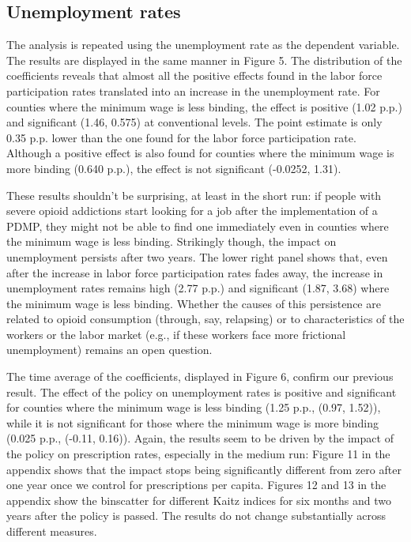 \documentclass[12pt,a4paper]{article}
\begin{document}
\begin{comment}
After six months:
1.79 (0.955, 2.63)
0.333 (-0.665, 1.33)

After two years:
-0.118 (-1.66, 1.42)
-0.599 (-3.10, 1.90)

Time averages:
1.06  (0.584, 1.55)
0.182 (-0.335, 0.698)
\end{comment}

\subsection*{Unemployment rates}

The analysis is repeated using the unemployment rate as the dependent variable.
The results are displayed in the same manner in Figure 5.
The distribution of the coefficients reveals that almost all the positive effects found in the labor force participation rates translated into an increase in the unemployment rate.
For counties where the minimum wage is less binding, the effect is positive (1.02 p.p.) and significant (1.46, 0.575) at conventional levels. 
The point estimate is only 0.35 p.p. lower than the one found for the labor force participation rate.
Although a positive effect is also found for counties where the minimum wage is more binding (0.640 p.p.), the effect is not significant (-0.0252, 1.31).

These results shouldn't be surprising, at least in the short run: if people with severe opioid addictions start looking for a job after the implementation of a PDMP, they might not be able to find one immediately even in counties where the minimum wage is less binding.
Strikingly though, the impact on unemployment persists after two years.
The lower right panel shows that, even after the increase in labor force participation rates fades away, the increase in unemployment rates remains high (2.77 p.p.) and significant (1.87, 3.68) where the minimum wage is less binding.
Whether the causes of this persistence are related to opioid consumption (through, say, relapsing) or to characteristics of the workers or the labor market (e.g., if these workers face more frictional unemployment) remains an open question.

The time average of the coefficients, displayed in Figure 6, confirm our previous result.
The effect of the policy on unemployment rates is positive and significant for counties where the minimum wage is less binding (1.25 p.p., (0.97, 1.52)), while it is not significant for those where the minimum wage is more binding (0.025 p.p., (-0.11, 0.16)).
Again, the results seem to be driven by the impact of the policy on prescription rates, especially in the medium run: Figure 11 in the appendix shows that the impact stops being significantly different from zero after one year once we control for prescriptions per capita.
Figures 12 and 13 in the appendix show the binscatter for different Kaitz indices for six months and two years after the policy is passed.
The results do not change substantially across different measures.
\end{document}
